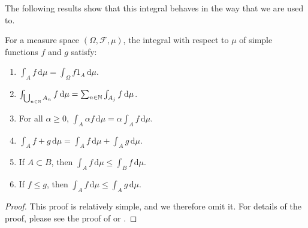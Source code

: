 \medskip

The following results show that this integral behaves in the way that we are used to.

\begin{proposition}\label{lbl_prop_simple_functions_integral_properties}
  For a measure space $(\Omega, \mathcal{F}, \mu)$, the integral with respect to $\mu$ of simple functions $f$ and $g$ satisfy:
  \begin{enumerate}[label = (\alph*)]
    \item $\int_A f \,\mathrm{d}\mu = \int_{\Omega} f 1_A \,\mathrm{d}\mu$.
    \item $\int_{\bigcup_{n \in \mathbb{N}} A_n} f \,\mathrm{d}\mu = \sum_{n \in \mathbb{N}} \int_{A_j}f \,\mathrm{d}\mu$.
    \item For all $\alpha \geq 0$, $\int_A \alpha f \,\mathrm{d}\mu = \alpha  \int_A f \,\mathrm{d}\mu$.
    \item $\int_A f + g \,\mathrm{d}\mu = \int_A f \,\mathrm{d}\mu + \int_A g \,\mathrm{d}\mu$.
    \item If $A \subset B$, then $\int_A f \,\mathrm{d}\mu \leq \int_B f \,\mathrm{d}\mu$.
    \item If $f \leq g$, then $\int_A f \,\mathrm{d}\mu \leq \int_A g \,\mathrm{d}\mu$.
  \end{enumerate}
\end{proposition}
\begin{proof}
  This proof is relatively simple, and we therefore omit it. For details of the proof, please see the proof of {\cite[Lemma 1.13]{teschl}} or {\cite[Chapter 2, Proposition 1.1]{stein}}.
\end{proof}

